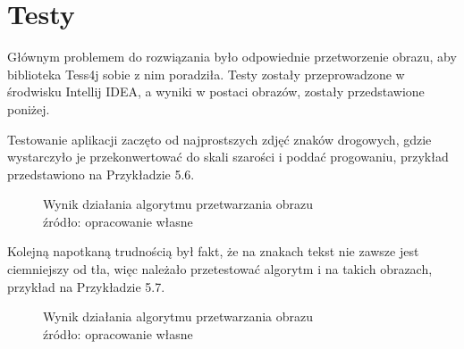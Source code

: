 \documentclass[eng,oneside]{mgr}
\begin{document}
\section{Testy}
Głównym problemem do rozwiązania było odpowiednie przetworzenie obrazu, aby biblioteka Tess4j sobie z nim poradziła. Testy zostały przeprowadzone w środwisku Intellij IDEA, a wyniki w postaci obrazów, zostały przedstawione poniżej.
\par Testowanie aplikacji zaczęto od najprostszych zdjęć znaków drogowych, gdzie wystarczyło je przekonwertować do skali szarości i poddać progowaniu, przykład przedstawiono na Przykładzie  5.6.
\begin{figure}[htbp]
\centering
\captionsetup{justification=centering}
\quad
{}
\renewcommand\figurename{Przykład}
\caption{Wynik działania algorytmu przetwarzania obrazu\\ 
źródło: opracowanie własne}
\end{figure}
\par Kolejną napotkaną trudnością był fakt, że na znakach tekst nie zawsze jest ciemniejszy od tła, więc należało przetestować algorytm i na takich obrazach, przykład na Przykładzie 5.7.
\begin{figure}[htbp]
\centering
\captionsetup{justification=centering}
\quad
{}
\renewcommand\figurename{Przykład}
\caption{Wynik działania algorytmu przetwarzania obrazu\\ 
źródło: opracowanie własne}
\end{figure}
\end{document}
